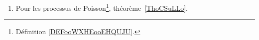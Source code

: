 
	\label{THEMEooTheoremeCentralLimite}
\begin{enumerate}
	\item
        Pour les processus de Poisson\footnote{Définition \ref{DEFooWXHEooEHQUJU}.}, théorème~\ref{ThoCSuLLo}.
\end{enumerate}

